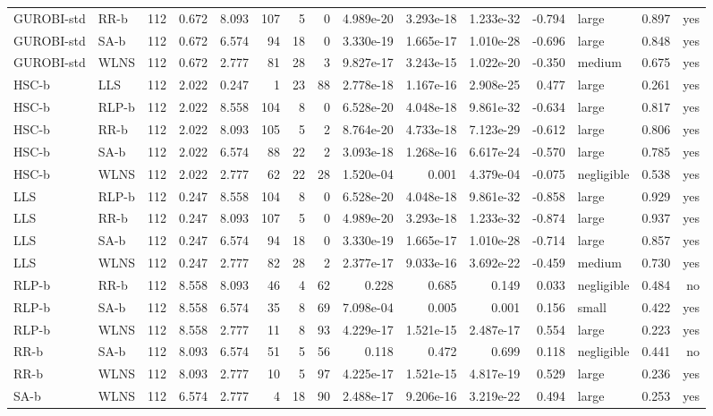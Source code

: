 \begin{table}[htbp]
\begin{tabular}{llrrrrrrrrrrlrr}
GUROBI-std & RR-b & 112 & 0.672 & 8.093 & 107 & 5 & 0 & 4.989e-20 & 3.293e-18 & 1.233e-32 & -0.794 & large & 0.897 & yes \\
GUROBI-std & SA-b & 112 & 0.672 & 6.574 & 94 & 18 & 0 & 3.330e-19 & 1.665e-17 & 1.010e-28 & -0.696 & large & 0.848 & yes \\
GUROBI-std & WLNS & 112 & 0.672 & 2.777 & 81 & 28 & 3 & 9.827e-17 & 3.243e-15 & 1.022e-20 & -0.350 & medium & 0.675 & yes \\
HSC-b & LLS & 112 & 2.022 & 0.247 & 1 & 23 & 88 & 2.778e-18 & 1.167e-16 & 2.908e-25 & 0.477 & large & 0.261 & yes \\
HSC-b & RLP-b & 112 & 2.022 & 8.558 & 104 & 8 & 0 & 6.528e-20 & 4.048e-18 & 9.861e-32 & -0.634 & large & 0.817 & yes \\
HSC-b & RR-b & 112 & 2.022 & 8.093 & 105 & 5 & 2 & 8.764e-20 & 4.733e-18 & 7.123e-29 & -0.612 & large & 0.806 & yes \\
HSC-b & SA-b & 112 & 2.022 & 6.574 & 88 & 22 & 2 & 3.093e-18 & 1.268e-16 & 6.617e-24 & -0.570 & large & 0.785 & yes \\
HSC-b & WLNS & 112 & 2.022 & 2.777 & 62 & 22 & 28 & 1.520e-04 & 0.001 & 4.379e-04 & -0.075 & negligible & 0.538 & yes \\
LLS & RLP-b & 112 & 0.247 & 8.558 & 104 & 8 & 0 & 6.528e-20 & 4.048e-18 & 9.861e-32 & -0.858 & large & 0.929 & yes \\
LLS & RR-b & 112 & 0.247 & 8.093 & 107 & 5 & 0 & 4.989e-20 & 3.293e-18 & 1.233e-32 & -0.874 & large & 0.937 & yes \\
LLS & SA-b & 112 & 0.247 & 6.574 & 94 & 18 & 0 & 3.330e-19 & 1.665e-17 & 1.010e-28 & -0.714 & large & 0.857 & yes \\
LLS & WLNS & 112 & 0.247 & 2.777 & 82 & 28 & 2 & 2.377e-17 & 9.033e-16 & 3.692e-22 & -0.459 & medium & 0.730 & yes \\
RLP-b & RR-b & 112 & 8.558 & 8.093 & 46 & 4 & 62 & 0.228 & 0.685 & 0.149 & 0.033 & negligible & 0.484 & no \\
RLP-b & SA-b & 112 & 8.558 & 6.574 & 35 & 8 & 69 & 7.098e-04 & 0.005 & 0.001 & 0.156 & small & 0.422 & yes \\
RLP-b & WLNS & 112 & 8.558 & 2.777 & 11 & 8 & 93 & 4.229e-17 & 1.521e-15 & 2.487e-17 & 0.554 & large & 0.223 & yes \\
RR-b & SA-b & 112 & 8.093 & 6.574 & 51 & 5 & 56 & 0.118 & 0.472 & 0.699 & 0.118 & negligible & 0.441 & no \\
RR-b & WLNS & 112 & 8.093 & 2.777 & 10 & 5 & 97 & 4.225e-17 & 1.521e-15 & 4.817e-19 & 0.529 & large & 0.236 & yes \\
SA-b & WLNS & 112 & 6.574 & 2.777 & 4 & 18 & 90 & 2.488e-17 & 9.206e-16 & 3.219e-22 & 0.494 & large & 0.253 & yes \\
\bottomrule
\end{tabular}
\end{table}
